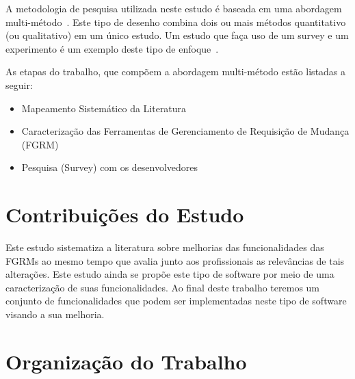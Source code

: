 A metodologia de pesquisa utilizada neste estudo é baseada em uma abordagem
multi-método~\cite{hesse2010mixed}. Este tipo de desenho combina dois ou mais
métodos quantitativo (ou qualitativo) em um único estudo. Um estudo que faça uso
de um survey e um experimento é um exemplo deste tipo de
enfoque~\cite{hesse2010mixed}.


As etapas do trabalho, que compõem a abordagem multi-método estão listadas a
seguir:

\begin{itemize}[(i)]
	\item Mapeamento Sistemático da Literatura~\cite{Petersen2008}
	\item Caracterização das Ferramentas de Gerenciamento de Requisição de
		Mudança (FGRM)
	\item Pesquisa (Survey) com os
		desenvolvedores~\cite{wohlin2012experimentation}
\end{itemize}

\section{Contribuições do Estudo}
\label{sec:intro-contribuicao}

Este estudo sistematiza a literatura sobre melhorias das funcionalidades das
FGRMs ao mesmo tempo que avalia junto aos profissionais as relevâncias de tais
alterações. Este estudo ainda se propõe este tipo de software por meio de uma
caracterização de suas funcionalidades. Ao final deste trabalho teremos um
conjunto de funcionalidades que podem ser implementadas neste tipo de software
visando a sua melhoria.

\section{Organização do Trabalho}
\label{sec:intro-organizacao-dissertacao}

